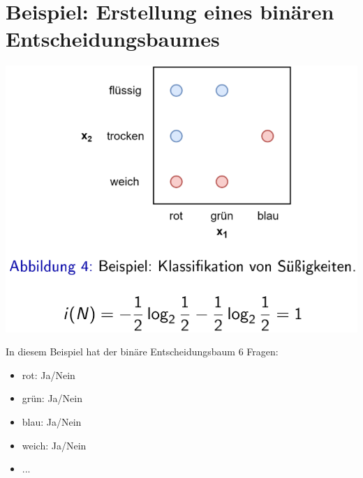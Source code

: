 \documentclass{report}
\begin{document}
  \section{Beispiel: Erstellung eines binären Entscheidungsbaumes}	
  
  \begin{center}	
    \includegraphics[scale=.3]{ml07_7}	
  \end{center}	
  
  In diesem Beispiel hat der binäre Entscheidungsbaum 6 Fragen:\\	
  \vspace*{-1.5em}	
  \begin{itemize}	
    \item rot: Ja/Nein	
    \item grün: Ja/Nein	
    \item blau: Ja/Nein	
    \item weich: Ja/Nein	
    \item ...	
  \end{itemize}	
  
\end{document}
